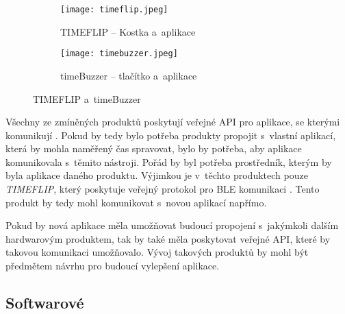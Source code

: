 \begin{figure}[h]
	\centering
	\begin{subfigure}[b]{5.2cm}
		\texttt{[image: timeflip.jpeg]}
		\caption{TIMEFLIP – Kostka a~aplikace \cite{timeflip}}
		\label{pic:timeflip}
	\end{subfigure}
	\hspace{2cm}
	\begin{subfigure}[b]{7cm}
		\texttt{[image: timebuzzer.jpeg]}
		\caption{timeBuzzer – tlačítko a~aplikace \cite{timebuzzer}}
		\label{pic:timebuzzer}
	\end{subfigure}
	\caption{TIMEFLIP a~timeBuzzer}
\end{figure}

Všechny ze zmíněných produktů poskytují veřejné API pro aplikace, se kterými komunikují \cite{timeflip-api} \cite{timeular-api} \cite{timebuzzer-api}. Pokud by tedy bylo potřeba produkty propojit s~vlastní aplikací, která by mohla naměřený čas spravovat, bylo by potřeba, aby aplikace komunikovala s~těmito nástroji. Pořád by byl potřeba prostředník, kterým by byla aplikace daného produktu. Výjimkou je v~těchto produktech pouze \emph{TIMEFLIP}, který poskytuje veřejný protokol pro BLE komunikaci \cite{timeflip-ble-api}. Tento produkt by tedy mohl komunikovat s~novou aplikací napřímo.

Pokud by nová aplikace měla umožňovat budoucí propojení s~jakýmkoli dalším hardwarovým produktem, tak by také měla poskytovat veřejné API, které by takovou komunikaci umožňovalo. Vývoj takových produktů by mohl být předmětem návrhu pro budoucí vylepšení aplikace.

\subsection{Softwarové}\label{software-tracking-triggers}

